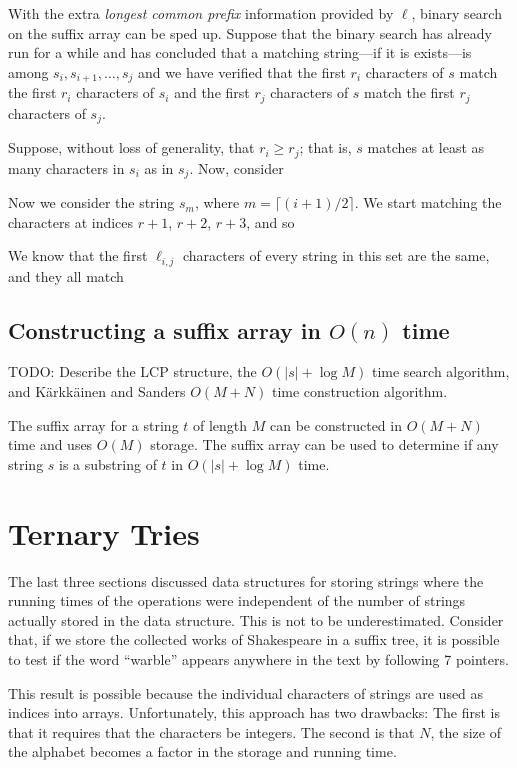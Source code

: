 With the extra \emph{longest common prefix} information provided by $\ell$, binary search on the suffix array can be sped up.  Suppose that the binary search has already run for a while and has concluded that a matching string---if it is exists---is among $s_i,s_{i+1},\ldots,s_j$ and we have verified that
the first $r_i$ characters of $s$ match the first $r_i$ characters of $s_i$ and the first $r_j$ characters of $s$ match the first $r_j$ characters of $s_j$.

Suppose, without loss of generality, that $r_i \ge r_j$; that is, $s$ matches at least as many characters in $s_i$ as in $s_j$.  Now, consider 


   Now we consider the string $s_m$, where $m=\lceil(i+1)/2\rceil$.  We start matching the characters at
indices $r+1$, $r+2$, $r+3$, and so


We know that the first $\ell_{i,j}$ characters of every string in this set are the same, and they all match 


\subsection{Constructing a suffix array in $O(n)$ time}


TODO: Describe the LCP structure, the $O(|s|+\log M)$ time search algorithm,
and K\"arkk\"ainen and Sanders $O(M+N)$ time construction algorithm.

\begin{thm}
The suffix array for a string $t$ of length $M$ can be constructed in
$O(M+N)$ time and uses $O(M)$ storage.  The suffix array can be used to
determine if any string $s$ is a substring of $t$ in $O(|s|+\log M)$ time.
\end{thm}


\section{Ternary Tries}

The last three sections discussed data structures for storing strings
where the running times of the operations were independent of the
number of strings actually stored in the data structure.  This is not
to be underestimated.  Consider that, if we store the collected works
of Shakespeare in a suffix tree, it is possible to test if the word
``warble'' appears anywhere in the text by following 7 pointers.

This result is possible because the individual characters of strings
are used as indices into arrays.  Unfortunately, this approach has
two drawbacks: The first is that it requires that the characters be
integers.  The second is that $N$, the size of the alphabet becomes a
factor in the storage and running time.

